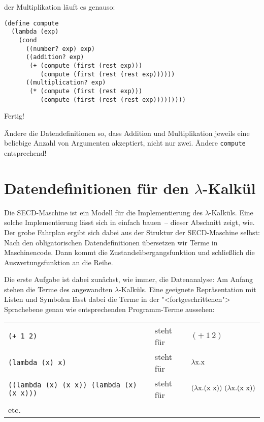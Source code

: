 der Multiplikation läuft es genauso:
%
\begin{lstlisting}
(define compute
  (lambda (exp)
    (cond
      ((number? exp) exp)
      ((addition? exp)
       (+ (compute (first (rest exp)))
          (compute (first (rest (rest exp))))))
      ((multiplication? exp)
       (* (compute (first (rest exp)))
          (compute (first (rest (rest exp)))))))))
\end{lstlisting}
% 
Fertig!
%
\begin{aufgabeinline}
  Ändere die Datendefinitionen so, dass Addition und Multiplikation
  jeweils eine beliebige Anzahl von Argumenten akzeptiert, nicht nur
  zwei.  Ändere \lstinline{compute} entsprechend!
\end{aufgabeinline}

\section{Datendefinitionen für den $\lambda$-Kalkül}
\label{sec:datendefinitionen-lambda}

%
Die SECD-Maschine ist ein Modell für die Implementierung des
$\lambda$-Kalküls.  Eine solche Implementierung lässt sich in einfach
bauen~-- dieser Abschnitt zeigt, wie.  Der grobe Fahrplan ergibt sich
dabei aus der Struktur der SECD-Maschine selbst: Nach den
obligatorischen Datendefinitionen übersetzen wir Terme in
Maschinencode.  Dann kommt die Zustandsübergangsfunktion und
schließlich die Auswertungsfunktion an die Reihe.

Die erste Aufgabe ist dabei zunächst, wie immer, die Datenanalyse: Am
Anfang stehen die Terme des angewandten $\lambda$-Kalküls.  Eine
geeignete Repräsentation mit Listen und Symbolen lässt dabei die Terme
in der "<fortgeschrittenen"> Sprachebene genau wie entsprechenden
Programm-Terme aussehen:

\noindent\begin{tabular}{lll}
  \texttt{(+ 1 2)} & steht für & $(+~1~2)$\\
  \texttt{(lambda (x) x)} & steht für & $\lambda \mathrm x.\mathrm x$\\
  \texttt{((lambda (x) (x x)) (lambda (x) (x x)))} & steht für &
  $(\lambda \mathrm x.(\mathrm x~\mathrm x))~(\lambda \mathrm x.(\mathrm x~\mathrm x))$\\
  etc.
\end{tabular}

